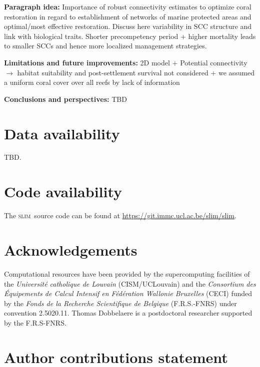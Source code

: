 \documentclass[preprint,12pt,authoryear]{elsarticle}
\newcommand{\slim}{\textsc{slim}\ }
\begin{document}
\textbf{Paragraph idea:} Importance of robust connectivity estimates to optimize coral restoration in regard to establishment of networks of marine protected areas and optimal/most effective restoration. Discuss here variability in SCC structure and link with biological traits. Shorter precompetency period + higher mortality leads to smaller SCCs and hence more localized management strategies.

\textbf{Limitations and future improvements:} 2D model $+$ Potential connectivity $\rightarrow$ habitat suitability and post-settlement survival not considered $+$ we assumed a uniform coral cover over all reefs by lack of information

\textbf{Conclusions and perspectives:} TBD


\section*{Data availability}

TBD.

\section*{Code availability}

The \slim source code can be found at \href{https://git.immc.ucl.ac.be/slim/slim}{https://git.immc.ucl.ac.be/slim/slim}.

\section*{Acknowledgements}

Computational resources have been provided by the supercomputing facilities of the \textit{Universit\'e catholique de Louvain} (CISM/UCLouvain) and the \textit{Consortium des \'Equipements de Calcul Intensif en F\'ed\'eration Wallonie Bruxelles} (CECI) funded by the \textit{Fonds de la Recherche Scientifique de Belgique} (F.R.S.-FNRS) under convention 2.5020.11. Thomas Dobbelaere is a postdoctoral researcher supported by the F.R.S-FNRS.

\section*{Author contributions statement}
\end{document}
